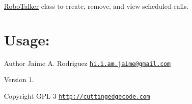 \hyperlink{class_robo_talker}{Robo\-Talker} class to create, remove, and view scheduled calls.\hypertarget{robo1_usage}{}\section{Usage\-:}\label{robo1_usage}



\begin{DoxyAuthor}{Author}
Jaime A. Rodriguez \href{mailto:hi.i.am.jaime@gmail.com}{\tt hi.\-i.\-am.\-jaime@gmail.\-com} 
\end{DoxyAuthor}
\begin{DoxyVersion}{Version}
1. 
\end{DoxyVersion}
\begin{DoxyCopyright}{Copyright}
G\-P\-L 3 \href{http://cuttingedgecode.com}{\tt http\-://cuttingedgecode.\-com} 
\end{DoxyCopyright}
